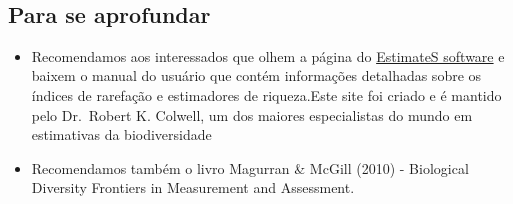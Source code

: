 \documentclass[
]{book}
\begin{document}
~

\hypertarget{para-se-aprofundar}{%
\subsection{Para se aprofundar}\label{para-se-aprofundar}}

\begin{itemize}
\item
  Recomendamos aos interessados que olhem a página do \href{http://viceroy.eeb.uconn.edu/estimates}{EstimateS software} e baixem o manual do usuário que contém informações detalhadas sobre os índices de rarefação e estimadores de riqueza.Este site foi criado e é mantido pelo Dr.~Robert K. Colwell, um dos maiores especialistas do mundo em estimativas da biodiversidade
\item
  Recomendamos também o livro Magurran \& McGill (2010) - Biological Diversity Frontiers in Measurement and Assessment.
\end{itemize}

  
\end{document}
